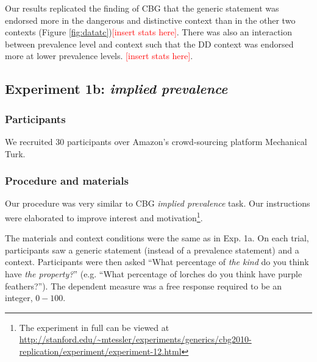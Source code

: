 \documentclass[10pt,letterpaper]{article}
\newcommand{\red}[1]{\textcolor{Red}{#1}}
\begin{document}


Our results replicated the finding of CBG that the generic statement was endorsed more in the dangerous and distinctive context than in the other two contexts (Figure \ref{fig:datatc})\red{[insert stats here]}. There was also an interaction between prevalence level and context such that the DD context was endorsed more at lower prevalence levels. \red{[insert stats here]}. 

\subsection{Experiment 1b: \emph{implied prevalence}}

\subsubsection{Participants}

We recruited 30 participants over Amazon's crowd-sourcing platform Mechanical Turk.  

\subsubsection{Procedure and materials}

Our procedure was very similar to CBG \emph{implied prevalence} task. Our instructions were elaborated to improve interest and motivation\footnote{The experiment in full can be viewed at \url{http://stanford.edu/~mtessler/experiments/generics/cbg2010-replication/experiment/experiment-12.html}}. 

The materials and context conditions were the same as in Exp. 1a. 
On each trial, participants saw a generic statement (instead of a prevalence statement) and a context. 
Participants were then asked ``What percentage of \emph{the kind} do you think have \emph{the property?}'' (e.g. ``What percentage of lorches do you think have  purple feathers?''). The dependent measure was a free response required to be an integer, $0-100$. 
\end{document}
